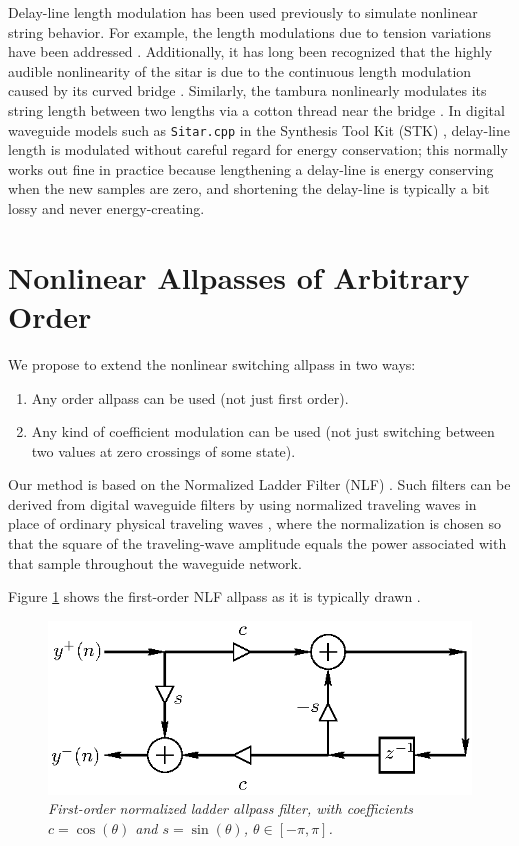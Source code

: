 \documentclass[twoside,a4paper]{article}
\begin{document}
Delay-line length modulation has been used previously to simulate
nonlinear string behavior.  For example, the length modulations due to
tension variations have been addressed \cite{TolonenEtAl00}.
Additionally, it has long been recognized that the highly audible
nonlinearity of the sitar is due to the continuous length modulation
caused by its curved bridge \cite{FletcherAndRossing98}.  Similarly,
the tambura nonlinearly modulates its string length between two
lengths via a cotton thread near the bridge
\cite{FletcherAndRossing98}.  In digital waveguide models such as
\texttt{Sitar.cpp} in the Synthesis Tool Kit (STK) \cite{STK4},
delay-line length is modulated without careful regard for energy
conservation; this normally works out fine in practice because
lengthening a delay-line is energy conserving when the new samples
are zero, and shortening the delay-line is typically a bit lossy
and never energy-creating.

\section{Nonlinear Allpasses of Arbitrary Order}

We propose to extend the nonlinear switching allpass in two ways:
\begin{enumerate}
\item Any order allpass can be used (not just first order).
\item Any kind of coefficient modulation can be used (not just
  switching between two values at zero crossings of some state).
\end{enumerate}
Our method is based on the Normalized Ladder Filter (NLF)
\cite{GrayAndMarkel75}. Such filters can be derived from digital
waveguide filters by using normalized traveling waves in place of
ordinary physical traveling waves \cite{PASP}, where the normalization
is chosen so that the square of the traveling-wave amplitude equals
the power associated with that sample throughout the waveguide
network.

Figure \ref{nlf} shows the first-order NLF allpass as it is typically
drawn \cite{MG,PASP}.

\begin{figure}[ht]
\centerline{\includegraphics{eps/nlf.eps}}
\caption{\label{nlf}{\it First-order normalized ladder allpass filter, with
coefficients $c=\cos(\theta)$ and $s=\sin(\theta)$, $\theta\in[-\pi,\pi]$.}}
\end{figure}
\end{document}
